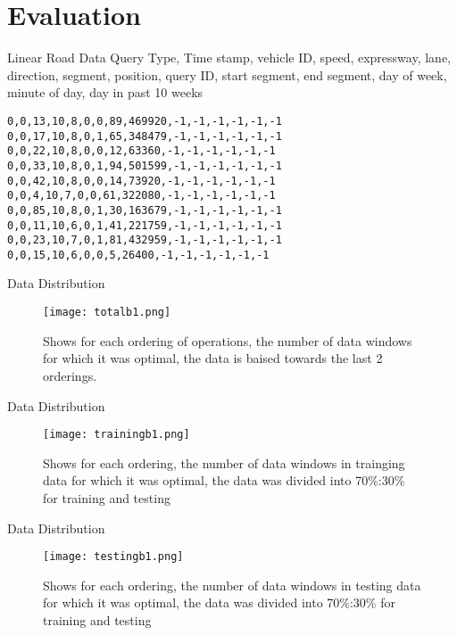 
\section{Evaluation}
\frame{\sectionpage}

\begin{frame}[fragile]{Linear Road Data}
Query Type, Time stamp, vehicle ID, speed, expressway, lane, direction, segment, position, query ID, start segment, end segment, day of week, minute of day, day in past 10 weeks
\begin{lstlisting}[caption= Example of Linear Road Data]
0,0,13,10,8,0,0,89,469920,-1,-1,-1,-1,-1,-1
0,0,17,10,8,0,1,65,348479,-1,-1,-1,-1,-1,-1
0,0,22,10,8,0,0,12,63360,-1,-1,-1,-1,-1,-1
0,0,33,10,8,0,1,94,501599,-1,-1,-1,-1,-1,-1
0,0,42,10,8,0,0,14,73920,-1,-1,-1,-1,-1,-1
0,0,4,10,7,0,0,61,322080,-1,-1,-1,-1,-1,-1
0,0,85,10,8,0,1,30,163679,-1,-1,-1,-1,-1,-1
0,0,11,10,6,0,1,41,221759,-1,-1,-1,-1,-1,-1
0,0,23,10,7,0,1,81,432959,-1,-1,-1,-1,-1,-1
0,0,15,10,6,0,0,5,26400,-1,-1,-1,-1,-1,-1
\end{lstlisting}
\end{frame}


\begin{frame}{Data Distribution}
    \begin{figure}
        \centering
        \texttt{[image: totalb1.png]}\\
        \caption{Shows for each ordering of operations, the number of data windows for which it was optimal, the data is baised towards the last 2 orderings.}
        \label{fig:totalb1}
    \end{figure}
\end{frame}


\begin{frame}{Data Distribution}
    \begin{figure}
        \centering
        \texttt{[image: trainingb1.png]}\\
        \caption{Shows for each ordering, the number of data windows in trainging data for which it was optimal, the data was divided into 70\%:30\% for training and testing}
        \label{fig:trainingb1}
    \end{figure}
\end{frame}

\begin{frame}{Data Distribution}
    \begin{figure}
        \centering
        \texttt{[image: testingb1.png]}\\
        \caption{Shows for each ordering, the number of data windows in testing data for which it was optimal, the data was divided into 70\%:30\% for training and testing}
        \label{fig:testingb1}
    \end{figure}
\end{frame}

